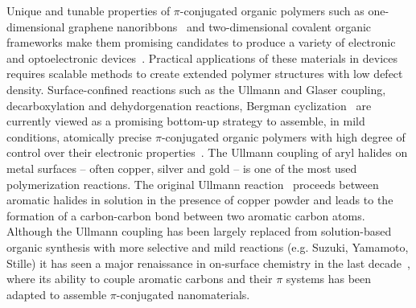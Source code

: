 \documentclass[aps,prb,amsmath,amssymb,11pt]{revtex4-1}
\begin{document}
\maketitle




Unique and tunable properties of $\pi$-conjugated organic polymers such as one-dimensional graphene nanoribbons~\cite{ullmann_106, ullmann_45, ullmann_107, ullmann_101} and two-dimensional covalent organic frameworks make them promising candidates to produce a variety of electronic and optoelectronic devices~\cite{ullmann_113, ullmann_114}. Practical applications of these materials in devices requires scalable methods to create extended polymer structures with low defect density.
Surface-confined reactions such as the Ullmann and Glaser coupling, decarboxylation and dehydorgenation reactions, Bergman cyclization~\cite{ullmann_140} are currently viewed as a promising bottom-up strategy to assemble, in mild conditions, atomically precise $\pi$-conjugated organic polymers with high degree of control over their electronic properties~\cite{ullmann_33}. 
The Ullmann coupling of aryl halides on metal surfaces -- often copper, silver and gold -- is one of the most used polymerization reactions. 
The original Ullmann reaction~\cite{ullmann_01} proceeds between aromatic halides in solution in the presence of copper powder and leads to the formation of a carbon-carbon bond between two aromatic carbon atoms. 
Although the Ullmann coupling has been largely replaced from solution-based organic synthesis with more selective and mild reactions (e.g. Suzuki, Yamamoto, Stille) it has seen a major renaissance in on-surface chemistry in the last decade~\cite{DIMA-refs}, where its ability to couple aromatic carbons and their $\pi$ systems has been adapted to assemble $\pi$-conjugated nanomaterials.
\end{document}
